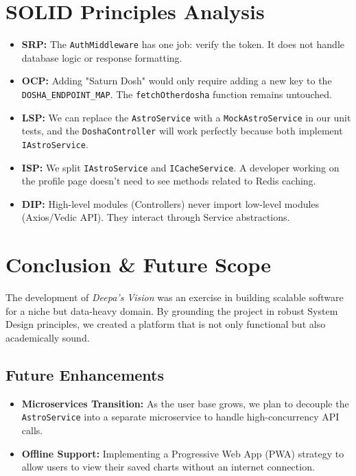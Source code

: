 \documentclass[12pt,a4paper]{article}
\begin{document}
\section{SOLID Principles Analysis}
\begin{itemize}
    \item \textbf{SRP:} The \texttt{AuthMiddleware} has one job: verify the token. It does not handle database logic or response formatting.
    \item \textbf{OCP:} Adding "Saturn Dosh" would only require adding a new key to the \texttt{DOSHA\_ENDPOINT\_MAP}. The \texttt{fetchOtherdosha} function remains untouched.
    \item \textbf{LSP:} We can replace the \texttt{AstroService} with a \texttt{MockAstroService} in our unit tests, and the \texttt{DoshaController} will work perfectly because both implement \texttt{IAstroService}.
    \item \textbf{ISP:} We split \texttt{IAstroService} and \texttt{ICacheService}. A developer working on the profile page doesn't need to see methods related to Redis caching.
    \item \textbf{DIP:} High-level modules (Controllers) never import low-level modules (Axios/Vedic API). They interact through Service abstractions.
\end{itemize}

\section{Conclusion \& Future Scope}
The development of \textit{Deepa's Vision} was an exercise in building scalable software for a niche but data-heavy domain. By grounding the project in robust System Design principles, we created a platform that is not only functional but also academically sound.

\subsection{Future Enhancements}
\begin{itemize}
    \item \textbf{Microservices Transition:} As the user base grows, we plan to decouple the \texttt{AstroService} into a separate microservice to handle high-concurrency API calls.
    \item \textbf{Offline Support:} Implementing a Progressive Web App (PWA) strategy to allow users to view their saved charts without an internet connection.
\end{itemize}
\end{document}
